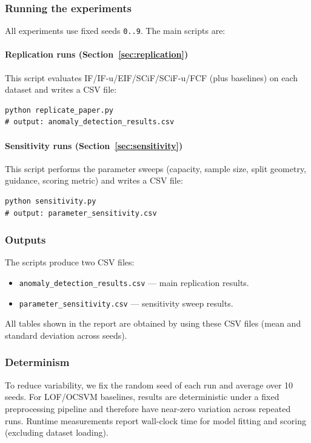 \subsubsection{Running the experiments}
All experiments use fixed seeds \texttt{0..9}. The main scripts are:

\paragraph{Replication runs (Section~\ref{sec:replication})}
This script evaluates IF/IF-u/EIF/SCiF/SCiF-u/FCF (plus baselines) on each dataset and writes a CSV file:
\begin{verbatim}
python replicate_paper.py
# output: anomaly_detection_results.csv
\end{verbatim}

\paragraph{Sensitivity runs (Section~\ref{sec:sensitivity})}
This script performs the parameter sweeps (capacity, sample size, split geometry, guidance, scoring metric) and writes a CSV file:
\begin{verbatim}
python sensitivity.py
# output: parameter_sensitivity.csv
\end{verbatim}

\subsubsection{Outputs}
The scripts produce two CSV files:
\begin{itemize}
  \item \texttt{anomaly\_detection\_results.csv} --- main replication results.
  \item \texttt{parameter\_sensitivity.csv} --- sensitivity sweep results.
\end{itemize}
All tables shown in the report are obtained by using these CSV files (mean and standard deviation across seeds).

\subsubsection{Determinism}
To reduce variability, we fix the random seed of each run and average over 10 seeds.
For LOF/OCSVM baselines, results are deterministic under a fixed preprocessing pipeline and therefore have near-zero variation across repeated runs.
Runtime measurements report wall-clock time for model fitting and scoring (excluding dataset loading).